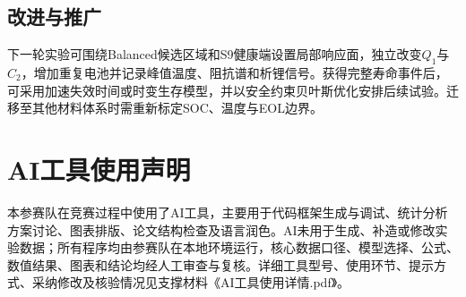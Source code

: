 \documentclass[withoutpreface]{cumcmthesis}
\begin{document}
\subsection{改进与推广}
下一轮实验可围绕Balanced候选区域和S9健康端设置局部响应面，独立改变$Q_1$与$C_2$，增加重复电池并记录峰值温度、阻抗谱和析锂信号。获得完整寿命事件后，可采用加速失效时间或时变生存模型，并以安全约束贝叶斯优化安排后续试验\cite{attia2020}。迁移至其他材料体系时需重新标定SOC、温度与EOL边界。


\section*{AI工具使用声明}
本参赛队在竞赛过程中使用了AI工具，主要用于代码框架生成与调试、统计分析方案讨论、图表排版、论文结构检查及语言润色。AI未用于生成、补造或修改实验数据；所有程序均由参赛队在本地环境运行，核心数据口径、模型选择、公式、数值结果、图表和结论均经人工审查与复核。详细工具型号、使用环节、提示方式、采纳修改及核验情况见支撑材料《AI工具使用详情.pdf》。

\begingroup
\small


\endgroup


\clearpage
\appendix
\end{document}
